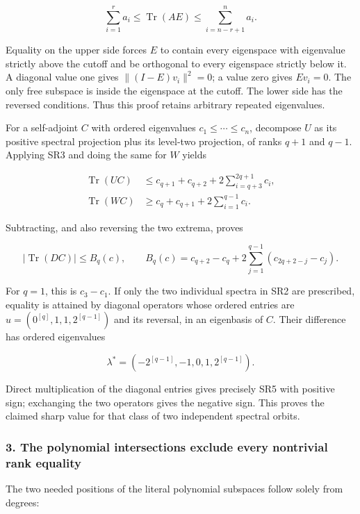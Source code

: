 \[
\sum_{i=1}^{r}a_i\le\operatorname{Tr}(AE)
\le\sum_{i=n-r+1}^{n}a_i.
\tag{SR3}
\]

Equality on the upper side forces \(E\) to contain every eigenspace with eigenvalue strictly above the cutoff and be orthogonal to every eigenspace strictly below it. A diagonal value one gives \(\|(I-E)v_i\|^2=0\); a value zero gives \(Ev_i=0\). The only free subspace is inside the eigenspace at the cutoff. The lower side has the reversed conditions. Thus this proof retains arbitrary repeated eigenvalues.

For a self-adjoint \(C\) with ordered eigenvalues \(c_1\le\cdots\le c_n\), decompose \(U\) as its positive spectral projection plus its level-two projection, of ranks \(q+1\) and \(q-1\). Applying SR3 and doing the same for \(W\) yields

\[
\begin{aligned}
\operatorname{Tr}(UC)&\le c_{q+1}+c_{q+2}
+2\sum_{i=q+3}^{2q+1}c_i,\\
\operatorname{Tr}(WC)&\ge c_q+c_{q+1}
+2\sum_{i=1}^{q-1}c_i.
\end{aligned}
\tag{SR4}
\]

Subtracting, and also reversing the two extrema, proves

\[
|\operatorname{Tr}(DC)|\le B_q(c),\qquad
B_q(c)=c_{q+2}-c_q+
2\sum_{j=1}^{q-1}(c_{2q+2-j}-c_j).
\tag{SR5}
\]

For \(q=1\), this is \(c_3-c_1\). If only the two individual spectra in SR2 are prescribed, equality is attained by diagonal operators whose ordered entries are \(u=(0^{[q]},1,1,2^{[q-1]})\) and its reversal, in an eigenbasis of \(C\). Their difference has ordered eigenvalues

\[
\lambda^*=(-2^{[q-1]},-1,0,1,2^{[q-1]}).
\tag{SR6}
\]

Direct multiplication of the diagonal entries gives precisely SR5 with positive sign; exchanging the two operators gives the negative sign. This proves the claimed sharp value for that class of two independent spectral orbits.

\subsubsection{3. The polynomial intersections exclude every nontrivial rank equality}\label{endpoint-four_window_sharpness_review--the-polynomial-intersections-exclude-every-nontrivial-rank-equality}

The two needed positions of the literal polynomial subspaces follow solely from degrees:

